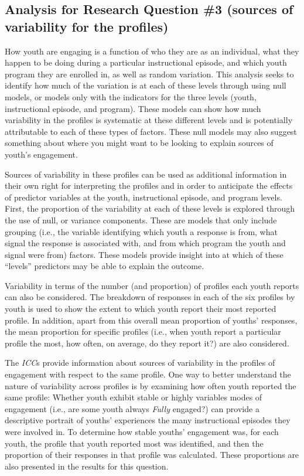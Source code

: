 \documentclass[]{book}
\theoremstyle{definition}
\theoremstyle{definition}
\theoremstyle{definition}
\theoremstyle{remark}
\begin{document}
\subsection{Analysis for Research Question \#3 (sources of variability
for the
profiles)}\label{analysis-for-research-question-3-sources-of-variability-for-the-profiles}

How youth are engaging is a function of who they are as an individual,
what they happen to be doing during a particular instructional episode,
and which youth program they are enrolled in, as well as random
variation. This analysis seeks to identify how much of the variation is
at each of these levels through using null models, or models only with
the indicators for the three levels (youth, instructional episode, and
program). These models can show how much variability in the profiles is
systematic at these different levels and is potentially attributable to
each of these types of factors. These null models may also suggest
something about where you might want to be looking to explain sources of
youth's engagement.

Sources of variability in these profiles can be used as additional
information in their own right for interpreting the profiles and in
order to anticipate the effects of predictor variables at the youth,
instructional episode, and program levels. First, the proportion of the
variability at each of these levels is explored through the use of null,
or variance components. These are models that only include grouping
(i.e., the variable identifying which youth a response is from, what
signal the response is associated with, and from which program the youth
and signal were from) factors. These models provide insight into at
which of these ``levels'' predictors may be able to explain the outcome.

Variability in terms of the number (and proportion) of profiles each
youth reports can also be considered. The breakdown of responses in each
of the six profiles by youth is used to show the extent to which youth
report their most reported profile. In addition, apart from this overall
mean proportion of youths' responses, the mean proportion for specific
profiles (i.e., when youth report a particular profile the most, how
often, on average, do they report it?) are also considered.

The \emph{ICC}s provide information about sources of variability in the
profiles of engagement with respect to the same profile. One way to
better understand the nature of variability across profiles is by
examining how often youth reported the same profile: Whether youth
exhibit stable or highly variables modes of engagement (i.e., are some
youth always \emph{Fully} engaged?) can provide a descriptive portrait
of youths' experiences the many instructional episodes they were
involved in. To determine how stable youths' engagement was, for each
youth, the profile that youth reported most was identified, and then the
proportion of their responses in that profile was calculated. These
proportions are also presented in the results for this question.
\end{document}

